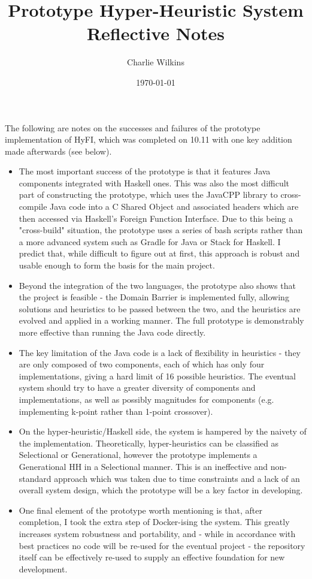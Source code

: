 \documentclass[11pt]{article}
\title{Prototype Hyper-Heuristic System Reflective Notes}
\author{Charlie Wilkins}
\date{\today}
\begin{document}
	\maketitle
	
	The following are notes on the successes and failures of the prototype implementation of HyFI, which was completed on 10.11 with one key addition made afterwards (see below).

	\begin{itemize}
		\item The most important success of the prototype is that it features Java components integrated with Haskell ones. This was also the most difficult part of constructing the prototype, which uses the JavaCPP library to cross-compile Java code into a C Shared Object and associated headers which are then accessed via Haskell's Foreign Function Interface. Due to this being a "cross-build" situation, the prototype uses a series of bash scripts rather than a more advanced system such as Gradle for Java or Stack for Haskell. I predict that, while difficult to figure out at first, this approach is robust and usable enough to form the basis for the main project.
		\item Beyond the integration of the two languages, the prototype also shows that the project is feasible - the Domain Barrier is implemented fully, allowing solutions and heuristics to be passed between the two, and the heuristics are evolved and applied in a working manner. The full prototype is demonstrably more effective than running the Java code directly.
		\item The key limitation of the Java code is a lack of flexibility in heuristics - they are only composed of two components, each of which has only four implementations, giving a hard limit of 16 possible heuristics. The eventual system should try to have a greater diversity of components and implementations, as well as possibly magnitudes for components (e.g. implementing k-point rather than 1-point crossover).
		\item On the hyper-heuristic/Haskell side, the system is hampered by the naivety of the implementation. Theoretically, hyper-heuristics can be classified as Selectional or Generational, however the prototype implements a Generational HH in a Selectional manner. This is an ineffective and non-standard approach which was taken due to time constraints and a lack of an overall system design, which the prototype will be a key factor in developing.
		\item One final element of the prototype worth mentioning is that, after completion, I took the extra step of Docker-ising the system. This greatly increases system robustness and portability, and - while in accordance with best practices no code will be re-used for the eventual project - the repository itself can be effectively re-used to supply an effective foundation for new development. 
	\end{itemize}
\end{document}
